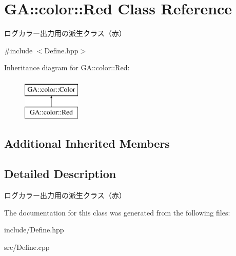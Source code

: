 \hypertarget{class_g_a_1_1color_1_1_red}{}\section{GA\+::color\+::Red Class Reference}
\label{class_g_a_1_1color_1_1_red}


ログカラー出力用の派生クラス（赤）  




{\ttfamily \#include $<$Define.\+hpp$>$}

Inheritance diagram for GA\+::color\+::Red\+:\begin{figure}[H]
\begin{center}
\leavevmode
\includegraphics[height=2.000000cm]{class_g_a_1_1color_1_1_red}
\end{center}
\end{figure}
\subsection*{Additional Inherited Members}


\subsection{Detailed Description}
ログカラー出力用の派生クラス（赤） 



The documentation for this class was generated from the following files\+:\begin{DoxyCompactItemize}
\item 
include/Define.\+hpp\item 
src/Define.\+cpp\end{DoxyCompactItemize}
